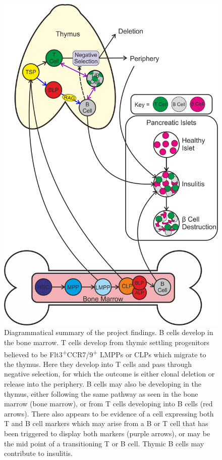 \begin{figure}
\includegraphics[width=\textwidth]{Figures/Summarydiagram2.png}
\caption[Diagrammatical summary of the project findings]{Diagrammatical summary of the project findings.
B cells develop in the bone marrow. 
T cells develop from thymic settling progenitors believed to be Flt3\textsuperscript{+}CCR7/9\textsuperscript{+} LMPPs or CLPs which migrate to the thymus.
Here they develop into T cells and pass through negative selection, for which the outcome is either clonal deletion or release into the periphery.
B cells may also be developing in the thymus, either following the same pathway as seen in the bone marrow (bone marrow), or from T cells developing into B cells (red arrows).
There also appears to be evidence of a cell expressing both T and B cell markers which may arise from a B or T cell that has been triggered to display both markers (purple arrows), or may be the mid point of a transitioning T or B cell.
Thymic B cells may contribute to insulitis.}
\label{fig:summarydiagram2}
\end{figure}














